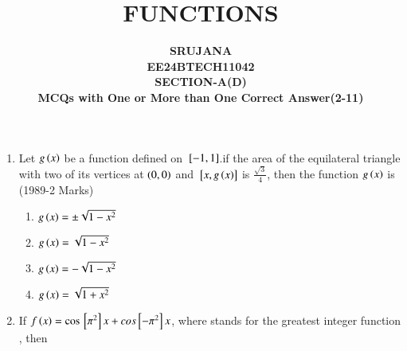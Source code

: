 \documentclass[journal,12pt,twocolumn]{IEEEtran}
\theoremstyle{remark}
\begin{document}

\vspace{3cm}

\title{\textbf{FUNCTIONS}}
\author{\textbf{SRUJANA\\EE24BTECH11042\\SECTION-A(D)\\MCQs with One or More than One Correct Answer(2-11)}}


\maketitle
\newpage
\bigskip

\renewcommand{\thefigure}{\theenumi}
\renewcommand{\thetable}{\theenmui}
\begin{enumerate}[start=2]
\item Let $g\left(x\right)$ be a function defined on ${}\left[-1,1\right]$.if the area of the equilateral triangle with two of its vertices at $\left(0,0\right)$ and ${}\left[x,g\left(x\right)\right]$ is $\frac{\sqrt{3}}{4}$, then the function $g\left(x\right)$ is
\hfill(1989-2 Marks)
\begin{multicols}{2}
\begin{enumerate} [label=(\alph*)] 
\item $g\left(x\right)=\pm\sqrt{1-x^2}$ 
\item $g\left(x\right)=\sqrt{1-x^2}$
\item $g\left(x\right)=-\sqrt{1-x^2}$
\item $g\left(x\right)=\sqrt{1+x^2}$
\end{enumerate}
\end{multicols}
\item If $f\left(x\right) = \cos{}\left[\pi^2\right]x + cos{}\left[-\pi^2\right]x$, where
 stands for the greatest integer function , then  


\end{enumerate}
\end{document}
